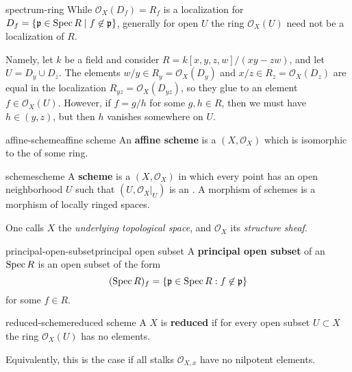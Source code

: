 \begin{example}{spectrum-ring}
    While $\mathcal{O}_X(D_f) = R_f$ is a localization for  $D_f = \{ \mathfrak{p} \in \operatorname{Spec} R \;|\; f \not\in \mathfrak{p} \}$, generally for open $U$ the ring $\mathcal{O}_X(U)$ need not be a localization of $R$.
    
    Namely, let $k$ be a field and consider $R = k[x, y, z, w] / (xy - zw)$, and let $U = D_y \cup D_z$. The elements $w/y \in R_y = \mathcal{O}_X(D_y)$ and $x/z \in R_z = \mathcal{O}_X(D_z)$ are equal in the localization $R_{yz} = \mathcal{O}_X(D_{yz})$, so they glue to an element $f \in \mathcal{O}_X(U)$. However, if $f = g/h$ for some $g, h \in R$, then we must have $h \in (y, z)$, but then $h$ vanishes somewhere on $U$.
\end{example}

\begin{topic}{affine-scheme}{affine scheme}
    An \textbf{affine scheme} is a  $(X, \mathcal{O}_X)$ which is isomorphic to the  of some ring.
\end{topic}

\begin{topic}{scheme}{scheme}
    A \textbf{scheme} is a  $(X, \mathcal{O}_X)$ in which every point has an open neighborhood $U$ such that $(U, \mathcal{O}_X|_U)$ is an . A morphism of schemes is a morphism of locally ringed spaces.
    
    One calls $X$ the \textit{underlying topological space}, and $\mathcal{O}_X$ its \textit{structure sheaf}.
\end{topic}

\begin{topic}{principal-open-subset}{principal open subset}
    A \textbf{principal open subset} of an  $\operatorname{Spec} R$ is an open subset of the form
    \[ (\operatorname{Spec} R)_f = \{ \mathfrak{p} \in \operatorname{Spec} R : f \not\in \mathfrak{p} \} \]
    for some $f \in R$.
\end{topic}

\begin{topic}{reduced-scheme}{reduced scheme}
    A  $X$ is \textbf{reduced} if for every open subset $U \subset X$ the ring $\mathcal{O}_X(U)$ has no  elements.
    
    Equivalently, this is the case if all stalks $\mathcal{O}_{X, x}$ have no nilpotent elements.
\end{topic}

